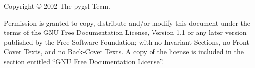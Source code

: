 Copyright \copyright{} 2002 The pygsl Team.

Permission is granted to copy, distribute and/or modify this document
under the terms of the GNU Free Documentation License, Version 1.1
or any later version published by the Free Software Foundation;
with no Invariant Sections, no Front-Cover Texts, and no Back-Cover Texts.
A copy of the license is included in the section entitled ``GNU
Free Documentation License''.

